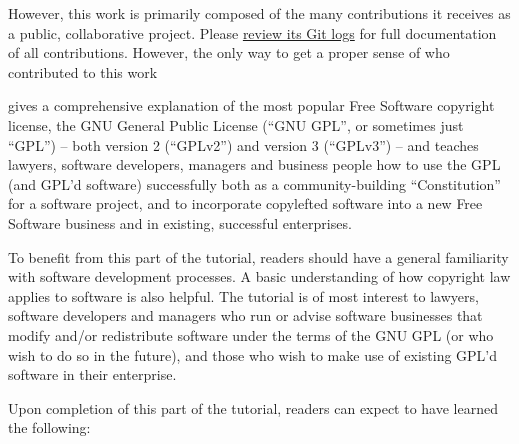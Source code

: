 {\begin{itemize}
\end{itemize}

However, this work is primarily composed of the many contributions it
receives as a public, collaborative project.  Please
\href{https://gitorious.org/copyleft-org/tutorial/history/master:gpl-lgpl.tex}{review
  its Git logs} for full documentation of all contributions.
However, the only way to get a proper sense of who contributed to this work
}
\pagebreak

 gives a
comprehensive explanation of the most popular Free Software copyright
license, the GNU General Public License (``GNU GPL'', or sometimes just
``GPL'') -- both version 2 (``GPLv2'') and version 3 (``GPLv3'') -- and
teaches lawyers, software developers, managers and business people how to use
the GPL (and GPL'd software) successfully both as a community-building
``Constitution'' for a software project, and to incorporate copylefted
software into a new Free Software business and in existing, successful
enterprises.

To benefit from this part of the tutorial, readers should
have a general familiarity with software development processes.  A basic
understanding of how copyright law applies to software is also helpful.  The
tutorial is of most interest to lawyers, software developers and managers who
run or advise software businesses that modify and/or redistribute software
under the terms of the GNU GPL (or who wish to do so in the future), and those
who wish to make use of existing GPL'd software in their enterprise.

Upon completion of this part of the tutorial, readers can expect
to have learned the following:

